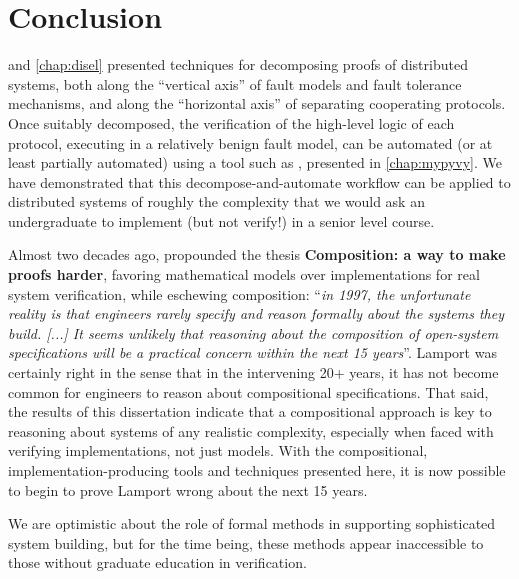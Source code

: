 \chapter{Conclusion}
\label{chap:conclusion}

 and \cref{chap:disel} presented techniques
  for decomposing proofs of distributed systems,
  both along the ``vertical axis'' of fault models and fault tolerance mechanisms,
  and along the ``horizontal axis'' of separating cooperating protocols.
Once suitably decomposed,
  the verification of the high-level logic of each protocol,
  executing in a relatively benign fault model,
  can be automated (or at least partially automated) using a tool such as \mypyvy,
  presented in \cref{chap:mypyvy}.
We have demonstrated that this decompose-and-automate workflow can be applied
  to distributed systems of roughly the complexity that we would ask an undergraduate
  to implement (but not verify!) in a senior level course.

Almost two decades ago, \citet{Lamport:COMPOS97} propounded the thesis
\textbf{Composition: a way to make proofs harder}, favoring
mathematical models over implementations for real system verification, while eschewing composition:
%
``\emph{in 1997, the unfortunate reality is that engineers rarely
  specify and reason formally about the systems they
  build. \emph{[...]} It seems unlikely that reasoning about the
  composition of open-system specifications will be a practical
  concern within the next 15 years}''.
%
Lamport was certainly right in the sense that in the intervening 20+ years,
  it has not become common for engineers to reason about compositional specifications.
That said, the results of this dissertation indicate that a compositional approach is key
  to reasoning about systems of any realistic complexity,
  especially when faced with verifying implementations, not just models.
With the compositional, implementation-producing tools and techniques presented here,
  it is now possible to begin to prove Lamport wrong about the next 15 years.

We are optimistic about the role of formal methods in supporting sophisticated
  system building, but for the time being,
  these methods appear inaccessible to those without graduate education in verification.

